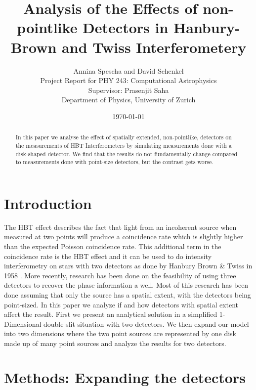 \documentclass{article}
\title{Analysis of the Effects of non-pointlike Detectors in Hanbury-Brown and Twiss Interferometery }
\author{
        Annina Spescha and David Schenkel \\
        \small Project Report for PHY 243: Computational Astrophysics \\
		\small Supervisor: Prasenjit Saha \\
		\small Department of Physics, University of Zurich\\
}
\date{\today}
\begin{document}
	
\maketitle
\begin{acronym}
\end{acronym}
\begin{abstract}
In this paper we analyse the effect of spatially extended, non-pointlike, detectors on the measurements of \ac{HBT} Interferometers by simulating measurements done with a disk-shaped detector. We find that the results do not fundamentally change compared to measurements done with point-size detectors, but the contrast gets worse.
\end{abstract}

\section{Introduction}
The \acf{HBT} effect describes the fact that light from an incoherent source when measured at two points will produce a coincidence rate which is slightly higher than the expected Poisson coincidence rate. This additional term in the coincidence rate is the \ac{HBT} effect and it can be used to do intensity interferometry on stars with two detectors as done by Hanbury Brown \& Twiss in 1958 \cite{hbt1958}. More recently, research has been done on the feasibility of using three detectors to recover the phase information a well. Most of this research has been done assuming that only the source has a spatial extent, with the detectors being point-sized. In this paper we analyze if and how detectors with spatial extent affect the result. First we present an analytical solution in a simplified 1-Dimensional double-slit situation with two detectors. We then expand our model into two dimensions where the two point sources are represented by one disk made up of many  point sources and analyze the results for two detectors.


\section{Methods: Expanding the detectors}
\end{document}
